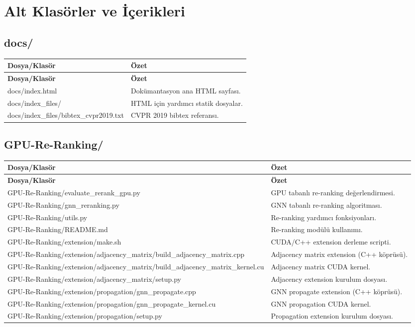 \documentclass[11pt,a4paper]{article}
\begin{document}
\section*{Alt Klasörler ve İçerikleri}
\subsection*{docs/}
\begin{longtable}{|p{}|p{}|}
\hline
\textbf{Dosya/Klasör} & \textbf{Özet} \\
\hline
\endfirsthead
\hline
\textbf{Dosya/Klasör} & \textbf{Özet} \\
\hline
\endhead

docs/index.html & Dokümantasyon ana HTML sayfası. \\
\hline
docs/index_files/ & HTML için yardımcı statik dosyalar. \\
\hline
docs/index_files/bibtex_cvpr2019.txt & CVPR 2019 bibtex referansı. \\
\hline
\end{longtable}

\subsection*{GPU-Re-Ranking/}
\begin{longtable}{|p{}|p{}|}
\hline
\textbf{Dosya/Klasör} & \textbf{Özet} \\
\hline
\endfirsthead
\hline
\textbf{Dosya/Klasör} & \textbf{Özet} \\
\hline
\endhead

GPU-Re-Ranking/evaluate_rerank_gpu.py & GPU tabanlı re-ranking değerlendirmesi. \\
\hline
GPU-Re-Ranking/gnn_reranking.py & GNN tabanlı re-ranking algoritması. \\
\hline
GPU-Re-Ranking/utils.py & Re-ranking yardımcı fonksiyonları. \\
\hline
GPU-Re-Ranking/README.md & Re-ranking modülü kullanımı. \\
\hline
GPU-Re-Ranking/extension/make.sh & CUDA/C++ extension derleme scripti. \\
\hline
GPU-Re-Ranking/extension/adjacency_matrix/build_adjacency_matrix.cpp & Adjacency matrix extension (C++ köprüsü). \\
\hline
GPU-Re-Ranking/extension/adjacency_matrix/build_adjacency_matrix_kernel.cu & Adjacency matrix CUDA kernel. \\
\hline
GPU-Re-Ranking/extension/adjacency_matrix/setup.py & Adjacency extension kurulum dosyası. \\
\hline
GPU-Re-Ranking/extension/propagation/gnn_propagate.cpp & GNN propagate extension (C++ köprüsü). \\
\hline
GPU-Re-Ranking/extension/propagation/gnn_propagate_kernel.cu & GNN propagation CUDA kernel. \\
\hline
GPU-Re-Ranking/extension/propagation/setup.py & Propagation extension kurulum dosyası. \\
\hline
\end{longtable}
\end{document}
